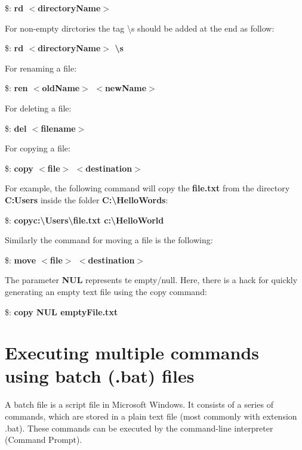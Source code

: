 \documentclass{article}
\begin{document}
	\par \$: \textbf{rd $<$directoryName$>$}
	
	For non-empty dirctories the tag \textbackslash s should be added at the end as follow:
	
	\par \$: \textbf{rd $<$directoryName$>$ \textbackslash s} 
	
	\par For renaming a file:
	
	\$: \textbf{ren $<$oldName$>$ $<$newName$>$}
	
	\par For deleting a file:
	
	\$: \textbf{del $<$filename$>$}
	
	\par For copying a file:
	
	\par \$: \textbf{copy $<$file$>$ $<$destination$>$}
	
	\par For example, the following command will copy the \textbf{file.txt} from the directory \textbf{C:Users} inside the folder \textbf{C:\textbackslash HelloWords}:
	
	\par \$: 	\textbf{copy\space\space c:\textbackslash Users\textbackslash file.txt \space c:\textbackslash HelloWorld 
	 }
	 
    \par Similarly the command for moving a file is the following:
    
    
    \par \$: \textbf{move $<$file$>$ $<$destination$>$}
    
    \par The parameter \textbf{NUL} represents te empty/null. Here, there is a hack for quickly generating an empty text file using the copy command: 
    \par \$: \textbf{copy NUL emptyFile.txt }
    
  
	
	\newpage
	\section{Executing multiple commands using batch (.bat) files}
	\par A batch file is a script file in Microsoft Windows. It consists of a series of commands, which are stored in a plain text file (most commonly with extension .bat). These commands can be executed by the command-line interpreter (Command Prompt).
    
\end{document}
